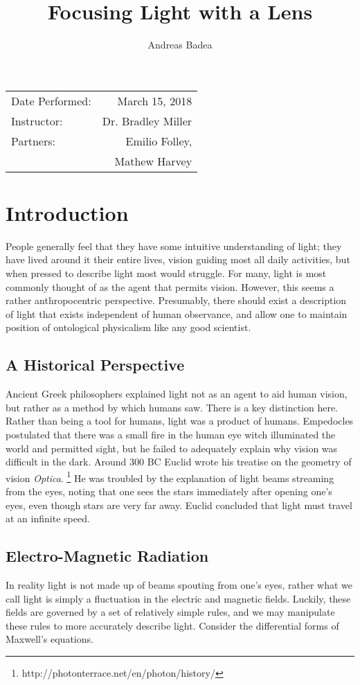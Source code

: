 \documentclass[]{article}
\title{Focusing Light with a Lens}
\author{Andreas Badea}
\begin{document}
\maketitle
\begin{center}
	\begin{tabular}{l r}
		Date Performed: & March 15, 2018 \\ %
		Instructor: & Dr. Bradley Miller \\ %
		Partners: & Emilio Folley,\\
		& Mathew Harvey

	\end{tabular}
\end{center}
\section{Introduction}
People generally feel that they have some intuitive understanding of light; they have lived around it their entire lives, vision guiding most all daily activities, but when pressed to describe light most would struggle. For many, light is most commonly thought of as the agent that permits vision. However, this seems a rather anthropocentric perspective. Presumably, there should exist a description of light that exists independent of human observance, and allow one to maintain position of ontological physicalism like any good scientist.

\subsection{A Historical Perspective}
Ancient Greek philosophers explained light not as an agent to aid human vision, but rather as a method by which humans saw. There is a key distinction here. Rather than being a tool for humans, light was a product of humans. Empedocles postulated that there was a small fire in the human eye witch illuminated the world and permitted sight, but he failed to adequately explain why vision was difficult in the dark. Around 300 BC Euclid wrote his treatise on the geometry of vision \textit{Optica}. \footnote{http://photonterrace.net/en/photon/history/} He was troubled by the explanation of light beams streaming from the eyes, noting that one sees the stars immediately after opening one’s eyes, even though stars are very far away. Euclid concluded that light must travel at an infinite speed.


\subsection{Electro-Magnetic Radiation}
In reality light is not made up of beams spouting from one's eyes, rather what we call light is simply a fluctuation in the electric and magnetic fields. Luckily, these fields are governed by a set of relatively simple rules, and we may manipulate these rules to more accurately describe light. Consider the differential forms of Maxwell's equations.
\end{document}
